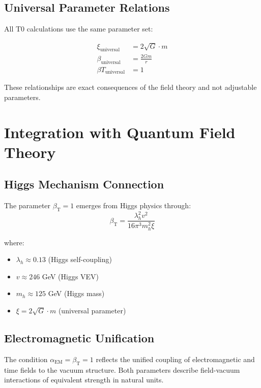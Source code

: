 \documentclass[12pt,a4paper]{article}
\newcommand{\betaT}{\beta_{\text{T}}}
\newcommand{\alphaEM}{\alpha_{\text{EM}}}
\begin{document}
	\subsection{Universal Parameter Relations}
	\label{subsec:universal_relations}
	
	All T0 calculations use the same parameter set:
	
\begin{align} 
	\xi_{\text{universal}} &= 2\sqrt{G} \cdot m \\ 
	\beta_{\text{universal}} &= \frac{2Gm}{r} \\ 
	\beta T_{\text{universal}} &= 1 
\end{align}
	
	These relationships are exact consequences of the field theory and not adjustable parameters.
	
	\section{Integration with Quantum Field Theory}
	\label{sec:qft_integration}
	
	\subsection{Higgs Mechanism Connection}
	\label{subsec:higgs_connection}
	
	The parameter $\betaT = 1$ emerges from Higgs physics through:
	\begin{equation}
		\betaT = \frac{\lambda_h^2 v^2}{16\pi^3 m_h^2 \xi}
	\end{equation}
	
	where:
	\begin{itemize}
		\item $\lambda_h \approx 0.13$ (Higgs self-coupling)
		\item $v \approx 246$ GeV (Higgs VEV)
		\item $m_h \approx 125$ GeV (Higgs mass)
		\item $\xi = 2\sqrt{G} \cdot m$ (universal parameter)
	\end{itemize}
	
	\subsection{Electromagnetic Unification}
	\label{subsec:em_unification}
	
	The condition $\alphaEM = \betaT = 1$ reflects the unified coupling of electromagnetic and time fields to the vacuum structure. Both parameters describe field-vacuum interactions of equivalent strength in natural units.
	
\end{document}

